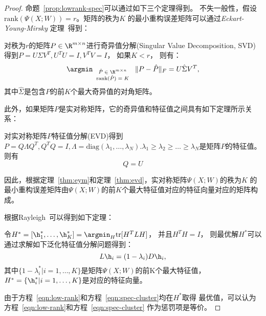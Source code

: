 \begin{proof}
    命题~\ref{prop:lowrank-spec}可以通过如下三个定理得到。
    不失一般性，假设$\text{rank}(\Psi(X;W)) = r$。矩阵的秩为$K$
    的最小重构误差矩阵可以通过\emph{Eckart-Young-Mirsky}
    定理~\cite{eckart1936approximation}得到：
    \begin{theorem}\label{thm:eym}
        对秩为$r$的矩阵$P\in \R^{m\times n}$进行奇异值分解(Singular Value
        Decomposition, SVD)得到$P=U\Sigma V^T, U^TU=I, V^TV=I$，
        如果$K < r$， 则有：
        $$%
            \argmin_{
                \mbox{\scriptsize
                    $
                    \begin{array}{c}
                        \hat{P} \in \R^{m\times n} \\
                        \text{rank}(\hat{P}) = K
                    \end{array}
                    $
                }
            } \|P - \hat{P}\|_F = U\hat{\Sigma}V^T,
        $$%
        其中$\hat{\Sigma}$是包含$P$的前$K$个最大奇异值的对角矩阵。
    \end{theorem}

此外，如果矩阵$P$是实对称矩阵，它的奇异值和特征值之间具有如下定理所示关系：
\begin{theorem}\label{thm:evd}
    对实对称矩阵$P$特征值分解(EVD)得到$P=Q\Lambda Q^T, Q^TQ = I,
    \Lambda = \text{diag}(\lambda_1, \ldots, \lambda_N).
    \lambda_1 \geq \lambda_2 \geq \ldots \geq \lambda_N$是矩阵$P$的特征值。则有
    $$Q=U$$
\end{theorem}
因此，根据定理~\ref{thm:eym}和定理~\ref{thm:evd}，实对称矩阵$\Psi(X;W)$的秩为$K$
的最小重构误差矩阵由$\Psi(X;W)$的前$K$个最大特征值对应的特征向量对应的矩阵构成。

根据Rayleigh~\cite{golub2012matrix}可以得到如下定理：
\begin{theorem}
    令$H^* = [\h_1^*, \ldots, \h_K^*] = \argmin_{H} \text{tr}[H^TLH]$，
    并且$H^TH = I$，
    则最优解$H^*$可以通过求解如下泛化特征值分解问题得到：
    $$
    L\h_i = (1-\lambda_i) D\h_i,
    $$
    其中$\{1-\lambda_i^* | i = 1,\ldots,
    K\}$是矩阵$\Psi(X;W)$的前K个最大特征值，
    $H^* = \{\h_i^* | i=1, \ldots, K\}$是对应的特征向量。
\end{theorem}
由于方程~\eqref{eqn:low-rank}和方程~\eqref{eqn:spec-cluster}均在$H^*$取得
最优值，可以认为方程~\eqref{eqn:low-rank}和方程~\eqref{eqn:spec-cluster}
作为惩罚项是等价。
\end{proof}

